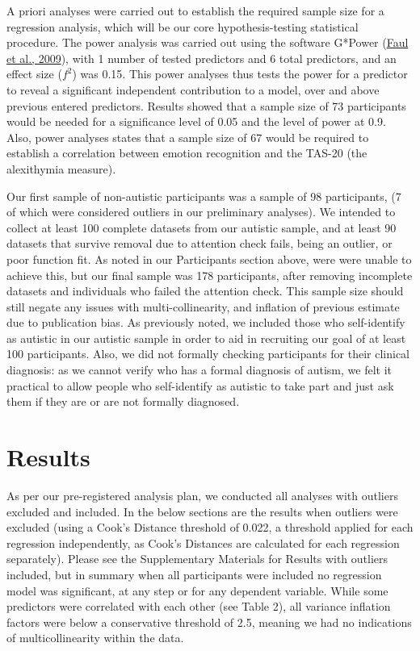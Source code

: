 \documentclass[
]{article}
\begin{document}
A priori analyses were carried out to establish the required sample size for a regression analysis, which will be our core hypothesis-testing statistical procedure. The power analysis was carried out using the software G*Power (\protect\hyperlink{ref-faul2009a}{Faul et al., 2009}), with 1 number of tested predictors and 6 total predictors, and an effect size (\(f^2\)) was 0.15. This power analyses thus tests the power for a predictor to reveal a significant independent contribution to a model, over and above previous entered predictors. Results showed that a sample size of 73 participants would be needed for a significance level of 0.05 and the level of power at 0.9. Also, power analyses states that a sample size of 67 would be required to establish a correlation between emotion recognition and the TAS-20 (the alexithymia measure).

Our first sample of non-autistic participants was a sample of 98 participants, (7 of which were considered outliers in our preliminary analyses). We intended to collect at least 100 complete datasets from our autistic sample, and at least 90 datasets that survive removal due to attention check fails, being an outlier, or poor function fit. As noted in our Participants section above, were were unable to achieve this, but our final sample was 178 participants, after removing incomplete datasets and individuals who failed the attention check. This sample size should still negate any issues with multi-collinearity, and inflation of previous estimate due to publication bias. As previously noted, we included those who self-identify as autistic in our autistic sample in order to aid in recruiting our goal of at least 100 participants. Also, we did not formally checking participants for their clinical diagnosis: as we cannot verify who has a formal diagnosis of autism, we felt it practical to allow people who self-identify as autistic to take part and just ask them if they are or are not formally diagnosed.

\hypertarget{results}{%
\section*{Results}\label{results}}

As per our pre-registered analysis plan, we conducted all analyses with outliers excluded and included. In the below sections are the results when outliers were excluded (using a Cook's Distance threshold of 0.022, a threshold applied for each regression independently, as Cook's Distances are calculated for each regression separately). Please see the Supplementary Materials for Results with outliers included, but in summary when all participants were included no regression model was significant, at any step or for any dependent variable. While some predictors were correlated with each other (see Table 2), all variance inflation factors were below a conservative threshold of 2.5, meaning we had no indications of multicollinearity within the data.
\end{document}
